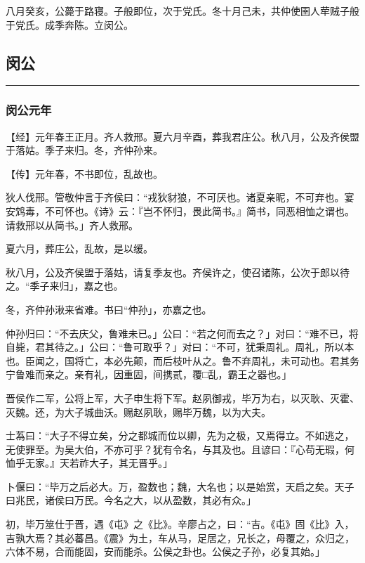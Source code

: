 \documentclass[]{article}
\begin{document}
八月癸亥，公薨于路寝。子般即位，次于党氏。冬十月己未，共仲使圉人荦贼子般于党氏。成季奔陈。立闵公。

\hypertarget{header-n610}{%
\subsection{闵公}\label{header-n610}}

\begin{center}\rule{0.5\linewidth}{\linethickness}\end{center}

\hypertarget{header-n612}{%
\subsubsection{闵公元年}\label{header-n612}}

【经】元年春王正月。齐人救邢。夏六月辛酉，葬我君庄公。秋八月，公及齐侯盟于落姑。季子来归。冬，齐仲孙来。

【传】元年春，不书即位，乱故也。

狄人伐邢。管敬仲言于齐侯曰：``戎狄豺狼，不可厌也。诸夏亲昵，不可弃也。宴安鸩毒，不可怀也。《诗》云：『岂不怀归，畏此简书。』简书，同恶相恤之谓也。请救邢以从简书。」齐人救邢。

夏六月，葬庄公，乱故，是以缓。

秋八月，公及齐侯盟于落姑，请复季友也。齐侯许之，使召诸陈，公次于郎以待之。``季子来归」，嘉之也。

冬，齐仲孙湫来省难。书曰``仲孙」，亦嘉之也。

仲孙归曰：``不去庆父，鲁难未已。」公曰：``若之何而去之？」对曰：``难不已，将自毙，君其待之。」公曰：``鲁可取乎？」对曰：``不可，犹秉周礼。周礼，所以本也。臣闻之，国将亡，本必先颠，而后枝叶从之。鲁不弃周礼，未可动也。君其务宁鲁难而亲之。亲有礼，因重固，间携贰，覆□乱，霸王之器也。」

晋侯作二军，公将上军，大子申生将下军。赵夙御戎，毕万为右，以灭耿、灭霍、灭魏。还，为大子城曲沃。赐赵夙耿，赐毕万魏，以为大夫。

士蒍曰：``大子不得立矣，分之都城而位以卿，先为之极，又焉得立。不如逃之，无使罪至。为吴大伯，不亦可乎？犹有令名，与其及也。且谚曰：『心苟无瑕，何恤乎无家。』天若祚大子，其无晋乎。」

卜偃曰：``毕万之后必大。万，盈数也；魏，大名也；以是始赏，天启之矣。天子曰兆民，诸侯曰万民。今名之大，以从盈数，其必有众。」

初，毕万筮仕于晋，遇《屯》之《比》。辛廖占之，曰：``吉。《屯》固《比》入，吉孰大焉？其必蕃昌。《震》为土，车从马，足居之，兄长之，母覆之，众归之，六体不易，合而能固，安而能杀。公侯之卦也。公侯之子孙，必复其始。」
\end{document}
